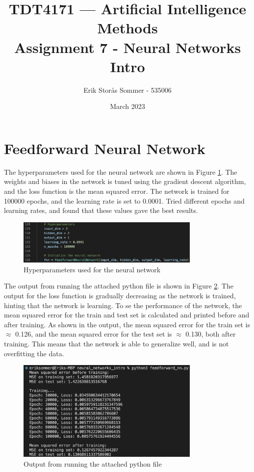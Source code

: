 \documentclass{article}
\title{TDT4171 — Artificial Intelligence Methods \\ Assignment 7 - Neural Networks Intro}
\author{Erik Storås Sommer - 535006}
\date{March 2023}
\begin{document}
\maketitle
\setlength{\parindent}{0pt}

\section*{Feedforward Neural Network}

The hyperparameters used for the neural network are shown in Figure \ref{fig:image1}.
The weights and biases in the network is tuned using the gradient descent algorithm, and the loss function is the mean squared error.
The network is trained for 100000 epochs, and the learning rate is set to 0.0001.
Tried different epochs and learning rates, and found that these values gave the best results.

\begin{figure}[hbtp]
    \centering
    \includegraphics[width=0.8\textwidth]{hyperparameters.png}
    \caption{Hyperparameters used for the neural network}
    \label{fig:image1}
\end{figure}

The output from running the attached python file is shown in Figure \ref{fig:image2}.
The output for the loss function is gradually decreasing as the network is trained, hinting that the network is learning.
To se the performance of the network, the mean squared error for the train and test set is calculated and printed before and after training.
As shown in the output, the mean squared error for the train set is $\approx$ 0.126, and the mean squared error for the test set is $\approx$ 0.130, both after training.
This means that the network is able to generalize well, and is not overfitting the data.

\begin{figure}[hbtp]
    \centering
    \includegraphics[width=0.8\textwidth]{output.png}
    \caption{Output from running the attached python file}
    \label{fig:image2}
\end{figure}
\end{document}
